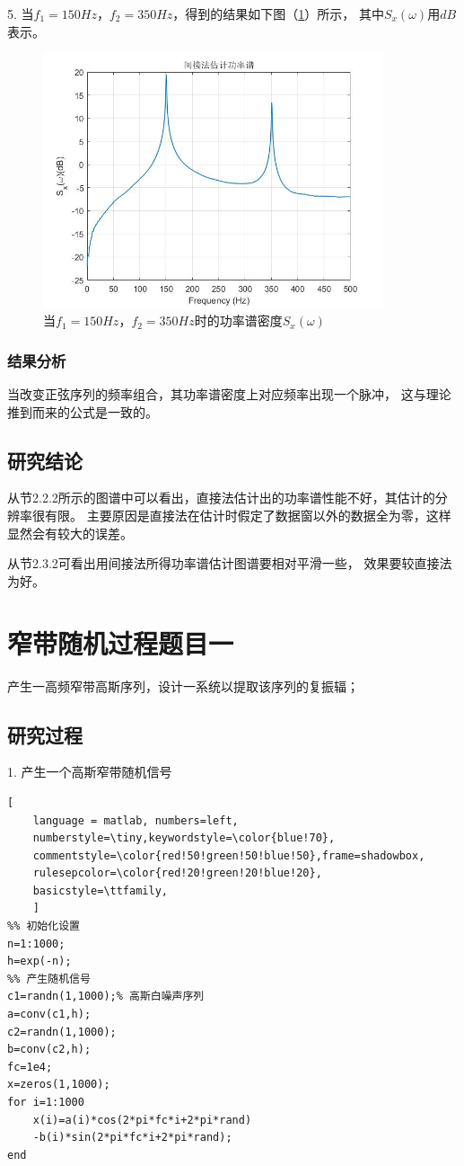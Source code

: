 \documentclass[UTF-8, a4paper, 12pt]{ctexart}
\begin{document}
5. 当$f_1=150Hz$，$ f_2=350Hz$，得到的结果如下图（\ref{f75}）所示，
其中$S_x(\omega)$用$dB$表示。
\begin{figure}[htbp]
    \centering
    \includegraphics[width=10cm]{figs/f75.jpg}
    \caption{当$f_1=150Hz$，$f_2=350Hz$时的功率谱密度$S_x(\omega)$}
    \label{f75}
\end{figure}

\subsubsection{结果分析}
当改变正弦序列的频率组合，其功率谱密度上对应频率出现一个脉冲，
这与理论推到而来的公式是一致的。

\subsection{研究结论}
从节2.2.2所示的图谱中可以看出，直接法估计出的功率谱性能不好，其估计的分辨率很有限。
主要原因是直接法在估计时假定了数据窗以外的数据全为零，这样显然会有较大的误差。

从节2.3.2可看出用间接法所得功率谱估计图谱要相对平滑一些，
效果要较直接法为好。


\newpage 
\section{窄带随机过程题目一}
产生一高频窄带高斯序列，设计一系统以提取该序列的复振辐；
\subsection{研究过程}
1. 产生一个高斯窄带随机信号
\begin{lstlisting}[
	language = matlab, numbers=left, 
	numberstyle=\tiny,keywordstyle=\color{blue!70},
	commentstyle=\color{red!50!green!50!blue!50},frame=shadowbox,
	rulesepcolor=\color{red!20!green!20!blue!20},
	basicstyle=\ttfamily,
	]
%% 初始化设置
n=1:1000;
h=exp(-n);
%% 产生随机信号
c1=randn(1,1000);% 高斯白噪声序列
a=conv(c1,h);    
c2=randn(1,1000);
b=conv(c2,h);
fc=1e4;
x=zeros(1,1000);
for i=1:1000
    x(i)=a(i)*cos(2*pi*fc*i+2*pi*rand)
    -b(i)*sin(2*pi*fc*i+2*pi*rand);
end
\end{lstlisting}
\end{document}
